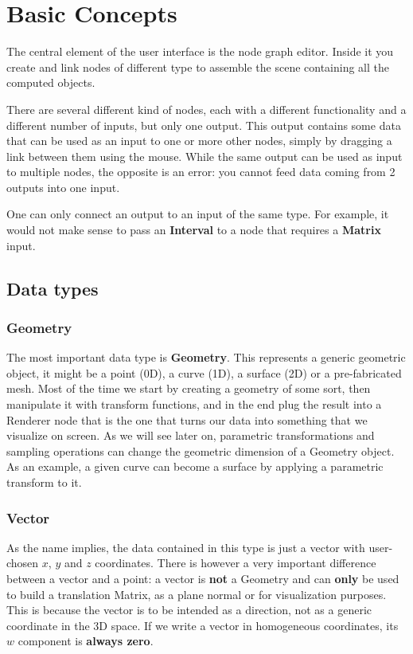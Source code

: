 \chapter{Basic Concepts}

The central element of the user interface is the node graph editor. Inside it
you create and link nodes of different type to assemble the scene containing all
the computed objects.

There are several different kind of nodes, each with a different functionality
and a different number of inputs, but only one output. This output contains
some data that can be used as an input to one or more other nodes, simply by dragging a link
between them using the mouse. While the same output can be used as input to multiple nodes,
the opposite is an error: you cannot feed data coming from 2 outputs into one input.

One can only connect an output to an input of the same type. For example, it
would not make sense to pass an \textbf{Interval} to a node that requires
a \textbf{Matrix} input.

\section{Data types}

\subsection{Geometry}
The most important data type is \textbf{Geometry}. This represents a generic geometric
object, it might be a point (0D), a curve (1D), a surface (2D) or a pre-fabricated mesh.
Most of the time we start by creating a geometry of some sort, then
manipulate it with transform functions, and in the end plug the result
into a Renderer node that is the one that turns our data into something
that we visualize on screen.
As we will see later on, parametric transformations and sampling operations
can change the geometric dimension of a Geometry object. As an example,
a given curve can become a surface by applying a parametric transform to it.

\subsection{Vector}
As the name implies, the data contained in this type is just a vector with
user-chosen $x$, $y$ and $z$ coordinates. There is however a very important
difference between a vector and a point: a vector is \textbf{not} a Geometry and
can \textbf{only} be used to build a translation Matrix, as a plane normal or for
visualization purposes. This is because the vector is to be intended as a direction,
not as a generic coordinate in the 3D space. If we write a vector
in homogeneous coordinates, its $w$ component is \textbf{always zero}.

